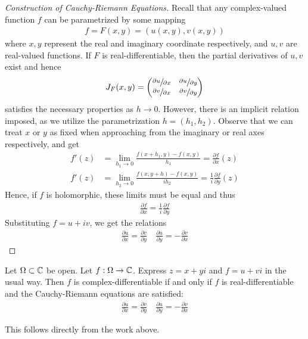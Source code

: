 \documentclass{memoir}
\begin{document}
\begin{proof}[Construction of Cauchy-Riemann Equations]
	Recall that any complex-valued function \(f\) can be parametrized by some mapping
	\begin{align*}
		f = F(x,y) = (u(x,y), v(x,y))
	\end{align*}
	where \(x,y\) represent the real and imaginary coordinate respectively, and \(u,v\) are real-valued functions. If \(F\) is real-differentiable, then the partial derivatives of \(u,v\) exist and hence
	\begin{align*}
		J_F(x,y) = \begin{pmatrix} \sfrac{\partial u}{\partial x} & \sfrac{\partial u}{\partial y} \\ \sfrac{\partial v}{\partial x} & \sfrac{\partial v}{\partial y}  \end{pmatrix}
	\end{align*}
	satisfies the necessary properties as \(h\to 0\). However, there is an implicit relation imposed, as we utilize the parametrization \(h = (h_1,h_2)\). Observe that we can treat \(x\) or \(y\) as fixed when approaching from the imaginary or real axes respectively, and get
	\begin{align*}
		f'(z) &= \lim_{h_1 \to 0} \frac{f(x+h_1,y) - f(x,y)}{h_1} = \frac{\partial f}{\partial x} (z)\\
		f'(z) &= \lim_{h_2 \to 0} \frac{f(x,y+h) - f(x,y)}{i h_2} = \frac{1}{i} \frac{\partial f}{\partial y} (z)
	\end{align*}
	Hence, if \(f\) is holomorphic, these limits must be equal and thus
	\begin{align*}
		\frac{\partial f}{\partial x} = \frac{1}{i} \frac{\partial f}{\partial y} 
	\end{align*}
	Substituting \(f = u + iv\), we get the relations
	\begin{align*}
		\frac{\partial u}{\partial x} = \frac{\partial v}{\partial y} \quad \frac{\partial u}{\partial y} = - \frac{\partial v}{\partial x} 
	\end{align*}
\end{proof}

\begin{thm}
	Let \(\Omega\subset \mathbb{C}\) be open. Let \(f:\Omega\to \mathbb{C}\). Express \(z = x+yi\) and \(f = u+vi\) in the usual way. Then \(f\) is complex-differentiable if and only if \(f\) is real-differentiable and the Cauchy-Riemann equations are satisfied:
	\begin{align*}
		\frac{\partial u}{\partial x} = \frac{\partial v}{\partial y} \quad \frac{\partial u}{\partial y} = -\frac{\partial v}{\partial x} 
	\end{align*}
\end{thm}
This follows directly from the work above.
\end{document}
